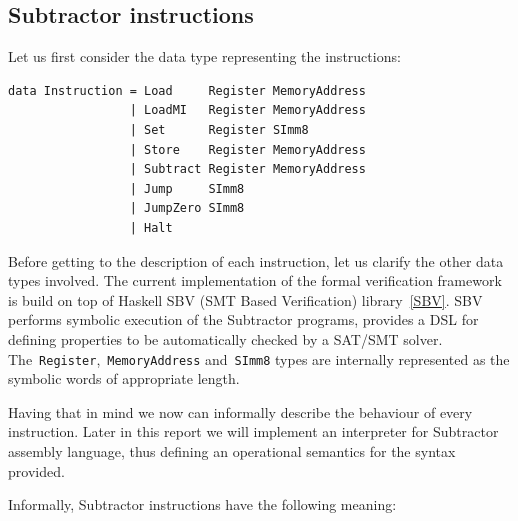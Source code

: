 \subsection{Subtractor instructions}

Let us first consider the data type representing the instructions:

\begin{verbatim}
data Instruction = Load     Register MemoryAddress
                 | LoadMI   Register MemoryAddress
                 | Set      Register SImm8
                 | Store    Register MemoryAddress
                 | Subtract Register MemoryAddress
                 | Jump     SImm8
                 | JumpZero SImm8
                 | Halt
\end{verbatim}

Before getting to the description of each instruction, let us clarify the other data types involved. The current implementation of the formal verification framework is build on top of Haskell SBV (SMT Based Verification) library~\ref{SBV}. SBV performs symbolic execution of the Subtractor programs, provides a DSL for defining properties to be automatically checked by a SAT/SMT solver. The~\texttt{Register},~\texttt{MemoryAddress} and~\texttt{SImm8} types are internally represented as the symbolic words of appropriate length.

Having that in mind we now can informally describe the behaviour of every instruction. Later in this report we will implement an interpreter for Subtractor assembly language, thus defining an operational semantics for the syntax provided.

Informally, Subtractor instructions have the following meaning:

